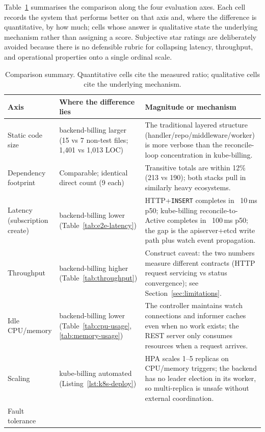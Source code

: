 Table~\ref{tab:summary-comparison} summarises the comparison along the four evaluation axes. Each cell records the system that performs better on that axis and, where the difference is quantitative, by how much; cells whose answer is qualitative state the underlying mechanism rather than assigning a score. Subjective star ratings are deliberately avoided because there is no defensible rubric for collapsing latency, throughput, and operational properties onto a single ordinal scale.

\begin{table}[h]
\centering
\small
\caption{Comparison summary. Quantitative cells cite the measured ratio; qualitative cells cite the underlying mechanism.}
\label{tab:summary-comparison}
\begin{tabularx}{\textwidth}{@{}lXX@{}}
\toprule
\textbf{Axis} & \textbf{Where the difference lies} & \textbf{Magnitude or mechanism} \\ \midrule
Static code size &
backend-billing larger (15 vs 7 non-test files; 1{,}401 vs 1{,}013 LOC) &
The traditional layered structure (handler/repo/middleware/worker) is more verbose than the reconcile-loop concentration in kube-billing. \\
Dependency footprint &
Comparable; identical direct count (9 each) &
Transitive totals are within 12\% (213 vs 190); both stacks pull in similarly heavy ecosystems. \\
Latency (subscription create) &
backend-billing lower (Table~\ref{tab:e2e-latency}) &
HTTP+\texttt{INSERT} completes in ~10\,ms p50; kube-billing reconcile-to-Active completes in ~100\,ms p50; the gap is the apiserver+etcd write path plus watch event propagation. \\
Throughput &
backend-billing higher (Table~\ref{tab:throughput}) &
Construct caveat: the two numbers measure different contracts (HTTP request servicing vs status convergence); see Section~\ref{sec:limitations}. \\
Idle CPU/memory &
backend-billing lower (Table~\ref{tab:cpu-usage}, \ref{tab:memory-usage}) &
The controller maintains watch connections and informer caches even when no work exists; the REST server only consumes resources when a request arrives. \\
Scaling &
kube-billing automated (Listing~\ref{lst:k8s-deploy}) &
HPA scales 1--5 replicas on CPU/memory triggers; the backend has no leader election in its worker, so multi-replica is unsafe without external coordination. \\
Fault tolerance &

\end{tabularx}
\end{table}
